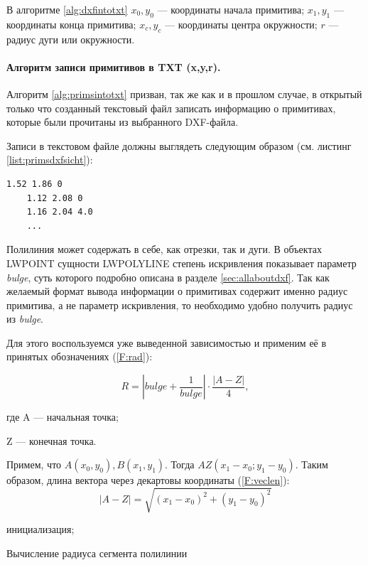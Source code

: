 В алгоритме \ref{alg:dxfintotxt} $x_0, y_0$ --- координаты начала примитива; $x_1, y_1$ --- координаты конца примитива; $x_c, y_c$ --- координаты центра окружности; $r$ --- радиус дуги или окружности.

\paragraph{Алгоритм записи примитивов в TXT (x,y,r).} Алгоритм \ref{alg:primsintotxt} призван, так же как и в прошлом случае, в открытый только что созданный текстовый файл записать информацию о примитивах, которые были прочитаны из выбранного DXF-файла.

Записи в текстовом файле должны выглядеть следующим образом (см. листинг \ref{list:primsdxfsicht}):

\begin{lstlisting}[caption={Пример содержания TXT-файла (x, y, r)},label=list:primsdxfsicht]
	1.52 1.86 0
	1.12 2.08 0
	1.16 2.04 4.0
	...
\end{lstlisting}

Полилиния может содержать в себе, как отрезки, так и дуги. В объектах LWPOINT сущности LWPOLYLINE степень искривления показывает параметр \textit{bulge}, суть которого подробно описана в разделе \ref{sec:allaboutdxf}. Так как желаемый формат вывода информации о примитивах содержит именно радиус примитива, а не параметр искривления, то необходимо удобно получить радиус из \textit{bulge}.

Для этого воспользуемся уже выведенной зависимостью \cite{ukoloff} и применим её в принятых обозначениях (\ref{F:rad}):

\begin{equation}
	R=|bulge+\frac{1}{bulge}|\cdot\frac{|A-Z|}{4},
	\label{F:rad}
\end{equation}

где A --- начальная точка;

Z --- конечная точка.

Примем, что $A(x_0,y_0), B(x_1,y_1)$. Тогда $AZ(x_1-x_0; y_1-y_0)$.
Таким образом, длина вектора через декартовы координаты (\ref{F:veclen}):
\begin{equation}
	|A-Z|=\sqrt{(x_1-x_0)^2+(y_1-y_0)^2}
	\label{F:veclen}
\end{equation}


\begin{algorithm}[H]
	\SetAlgoLined
	инициализация;
	
	
	\caption{Вычисление радиуса сегмента полилинии}
	\label{alg:polyarcrad}
\end{algorithm}

